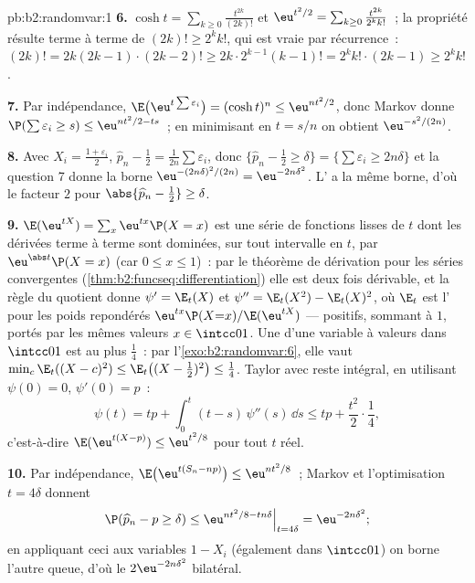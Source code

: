 \begin{solution}{pb:b2:randomvar:1}
\textbf{6.} $\cosh t = \sum_{k\geq0}\frac{t^{2k}}{(2k)!}$ et
$\eu^{t^2/2} = \sum_{k\geq0}\frac{t^{2k}}{2^kk!}$~; la
propriété résulte terme à terme de $(2k)! \geq 2^kk!$, qui est vraie par
récurrence~: $(2k)! = 2k(2k-1)\cdot(2k-2)! \geq 2k\cdot
2^{k-1}(k-1)! = 2^kk!\cdot(2k-1) \geq 2^kk!$.

\textbf{7.} Par indépendance, $\E\bigl(\eu^{t\sum\varepsilon_i}
\bigr) = (\cosh t)^n \leq \eu^{nt^2/2}$, donc Markov donne
$\P(\sum\varepsilon_i \geq s) \leq \eu^{nt^2/2 - ts}$~;
en minimisant en $t = s/n$ on obtient $\eu^{-s^2/(2n)}$.

\textbf{8.} Avec $X_i = \frac{1 + \varepsilon_i}2$, $\widehat
p_n - \frac12 = \frac1{2n}\sum\varepsilon_i$, donc
$\{\widehat p_n - \frac12 \geq \delta\} =
\{\sum\varepsilon_i \geq 2n\delta\}$ et la question 7 donne la
borne $\eu^{-(2n\delta)^2/(2n)} = \eu^{-2n\delta^2}$. L'
 a la même borne, d'où le facteur $2$ pour
$\abs{\widehat p_n - \frac12} \geq \delta$.

\textbf{9.} $\E(\eu^{tX}) = \sum_x\eu^{tx}\P(X = x)$ est une
série de fonctions lisses de $t$ dont les dérivées terme à terme
sont dominées, sur tout intervalle  en $t$, par
$\eu^{\abs t}\P(X = x)$ (car $0 \leq x \leq 1$)~: par le
théorème de dérivation pour les séries  convergentes
(\cref{thm:b2:funcseq:differentiation}) elle est deux fois
dérivable, et la règle du quotient donne $\psi' = \E_t(X)$
et $\psi'' = \E_t(X^2) - \E_t(X)^2$, où $\E_t$ est
l' pour les poids repondérés
$\eu^{tx}\P(X{=}x)/\E(\eu^{tX})$ --- positifs, sommant à
$1$, portés par les mêmes valeurs $x \in \intcc01$. Une 
d'une variable à valeurs dans $\intcc01$ est au plus $\frac14$~: par
l'\cref{exo:b2:randomvar:6}, elle vaut $\min_c\E_t((X - c)^2) \leq
\E_t\bigl((X - \tfrac12)^2\bigr) \leq \tfrac14$. Taylor avec
reste intégral, en utilisant $\psi(0) = 0$, $\psi'(0) = p$~:
\[
\psi(t) = tp + \int_0^t(t - s)\,\psi''(s)\,\dd s
\leq tp + \frac{t^2}2\cdot\frac14,
\]
c'est-à-dire $\E(\eu^{t(X - p)}) \leq \eu^{t^2/8}$ pour tout $t$ réel.

\textbf{10.} Par indépendance, $\E\bigl(\eu^{t(S_n -
np)}\bigr) \leq \eu^{nt^2/8}$~; Markov et l'optimisation $t
= 4\delta$ donnent
\[
\P(\widehat p_n - p \geq \delta)
\leq \eu^{nt^2/8 - tn\delta}\Big|_{t = 4\delta}
= \eu^{-2n\delta^2};
\]
en appliquant ceci aux variables $1 - X_i$ (également dans
$\intcc01$) on borne l'autre queue, d'où le
$2\eu^{-2n\delta^2}$ bilatéral.


\end{solution}
